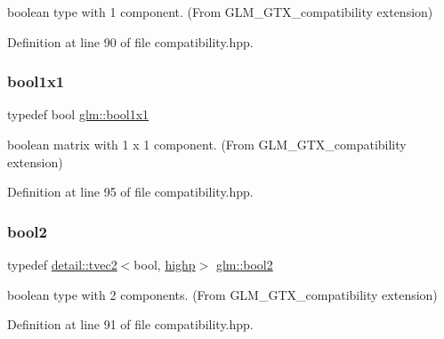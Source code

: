 boolean type with 1 component. (From G\+L\+M\+\_\+\+G\+T\+X\+\_\+compatibility extension) 



Definition at line 90 of file compatibility.\+hpp.

\mbox{\label{group__gtx__compatibility_ga98d9d3da22aebc872ba38ce5afa0eff7}} 
\subsubsection{\texorpdfstring{bool1x1}{bool1x1}}
{\footnotesize\ttfamily typedef bool \hyperlink{group__gtx__compatibility_ga98d9d3da22aebc872ba38ce5afa0eff7}{glm\+::bool1x1}}



boolean matrix with 1 x 1 component. (From G\+L\+M\+\_\+\+G\+T\+X\+\_\+compatibility extension) 



Definition at line 95 of file compatibility.\+hpp.

\mbox{\label{group__gtx__compatibility_gafede6e8549e9bb9da63f404022298d40}} 
\subsubsection{\texorpdfstring{bool2}{bool2}}
{\footnotesize\ttfamily typedef \hyperlink{structglm_1_1detail_1_1tvec2}{detail\+::tvec2}$<$bool, \hyperlink{namespaceglm_a0f04f086094c747d227af4425893f545ac6f7eab42eacbb10d59a58e95e362074}{highp}$>$ \hyperlink{group__gtx__compatibility_gafede6e8549e9bb9da63f404022298d40}{glm\+::bool2}}



boolean type with 2 components. (From G\+L\+M\+\_\+\+G\+T\+X\+\_\+compatibility extension) 



Definition at line 91 of file compatibility.\+hpp.

\mbox{\label{group__gtx__compatibility_ga44cd09c0dad9ea163f038a342555867f}} 
